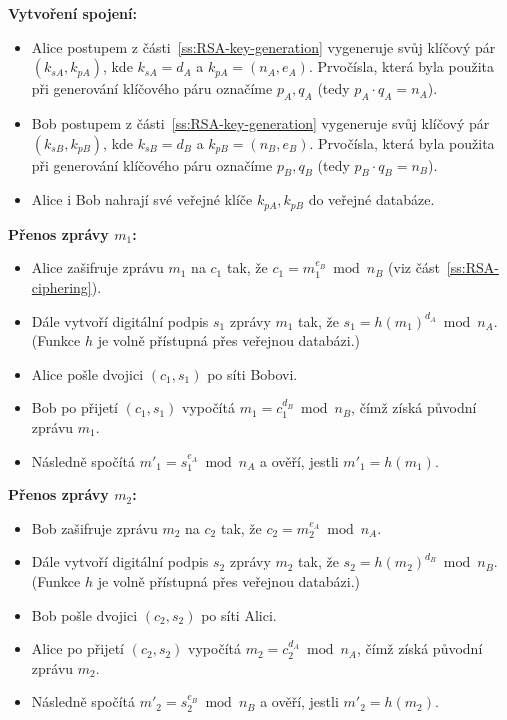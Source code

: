\documentclass[
  program=infoi,
  biblatex=false,
  figures=true,
  glossaries,
  tables=false,
  sourcecodes=true,
  index
]{kidiplom}
\begin{document}
    \noindent
    \textbf{Vytvoření spojení:}
    \begin{itemize}
        \item 
            Alice postupem z části~\ref{ss:RSA-key-generation} vygeneruje svůj klíčový pár $(k_{sA}, k_{pA})$, kde
            $k_{sA} = d_A$ a $k_{pA} = (n_A,e_A)$.
            Prvočísla, která byla použita při generování klíčového páru označíme $p_A, q_A$ (tedy $p_A \cdot q_A = n_A$).
        \item
            Bob postupem z části~\ref{ss:RSA-key-generation} vygeneruje svůj klíčový pár $(k_{sB}, k_{pB})$, kde
            $k_{sB} = d_B$ a $k_{pB} = (n_B,e_B)$.
            Prvočísla, která byla použita při generování klíčového páru označíme $p_B, q_B$ (tedy $p_B \cdot q_B = n_B$).
        \item
            Alice i Bob nahrají své veřejné klíče $k_{pA}, k_{pB}$ do veřejné databáze.
    \end{itemize}

    \medskip

    \noindent
    \textbf{Přenos zprávy $m_1$:}
    \begin{itemize}
        \item 
            Alice zašifruje zprávu $m_1$ na $c_1$ tak, že $c_1 = m_1^{e_B} \bmod{n_B}$ (viz část~\ref{ss:RSA-ciphering}).
        \item
            Dále vytvoří digitální podpis $s_1$ zprávy $m_1$ tak, že $s_1 = h(m_1)^{d_A} \bmod{n_A}$.
            (Funkce $h$ je volně přístupná přes veřejnou databázi.)
        \item
            Alice pošle dvojici $(c_1,s_1)$ po síti Bobovi.
        \item
            Bob po přijetí $(c_1,s_1)$ vypočítá $m_1 = c_1^{d_B} \bmod{n_B}$, čímž získá původní zprávu $m_1$.
        \item
            Následně spočítá $m'_1 = s_1^{e_A} \bmod{n_A}$ a ověří, jestli $m'_1 = h(m_1)$.
    \end{itemize}
            
    \medskip

    \noindent
    \textbf{Přenos zprávy $m_2$:}
    \begin{itemize}
        \item 
            Bob zašifruje zprávu $m_2$ na $c_2$ tak, že $c_2 = m_2^{e_A} \bmod{n_A}$.
        \item
            Dále vytvoří digitální podpis $s_2$ zprávy $m_2$ tak, že $s_2 = h(m_2)^{d_B} \bmod{n_B}$.
            (Funkce $h$ je volně přístupná přes veřejnou databázi.)
        \item
            Bob pošle dvojici $(c_2,s_2)$ po síti Alici.
        \item
            Alice po přijetí $(c_2,s_2)$ vypočítá $m_2 = c_2^{d_A} \bmod{n_A}$, čímž získá původní zprávu $m_2$.
        \item
            Následně spočítá $m'_2 = s_2^{e_B} \bmod{n_B}$ a ověří, jestli $m'_2 = h(m_2)$.
    \end{itemize}
\end{document}
